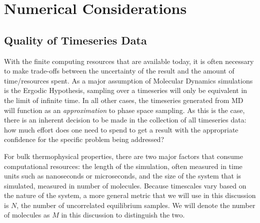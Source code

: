 \documentclass[9pt,bestpractices]{livecoms}
\begin{document}
\section{Numerical Considerations}

\subsection{Quality of Timeseries Data}
With the finite computing resources that are available today, it is often necessary to make trade-offs between the uncertainty of the result and the amount of time/resources spent.  As a major assumption of Molecular Dynamics simulations is the Ergodic Hypothesis, sampling over a timeseries will only be equivalent in the limit of infinite time. In all other cases, the timeseries generated from MD will function as an \emph{approximation} to phase space sampling. As this is the case, there is an inherent decision to be made in the collection of all timeseries data: how much effort does one need to spend to get a result with the appropriate confidence for the specific problem being addressed? 

For bulk thermophysical properties, there are two major factors that consume computational resources: the length of the simulation, often measured in time units such as nanoseconds or microseconds, and the size of the system that is simulated, measured in number of molecules.  Because timescales vary based on the nature of the system, a more general metric that we will use in this discussion is $N$, the number of uncorrelated equilibrium samples. We will denote the number of molecules as $M$ in this discussion to distinguish the two.
\end{document}
